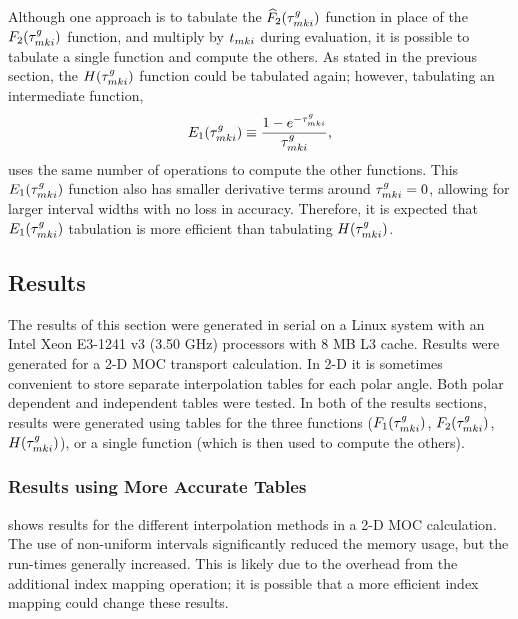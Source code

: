 {{{      Although one approach is to tabulate the $\modFunc$ function in place of the $F_2(\segopt)$ function, and multiply by $\nsegl$ during evaluation, it is possible to tabulate a single function and compute the others.
      As stated in the previous section, the $H(\segopt)$ function could be tabulated again; however, tabulating an intermediate function,
      \begin{equation}\label{eq:LSMOC:ET:E1}
        E_1(\segopt) \defined \frac{1-e^{-\segopt}}{\segopt},
      \end{equation}
      uses the same number of operations to compute the other functions.
      This $E_1(\segopt)$ function also has smaller derivative terms around $\segopt=0$, allowing for larger interval widths with no loss in accuracy.
      Therefore, it is expected that $E_1(\segopt)$ tabulation is more efficient than tabulating $H(\segopt)$.
    }
    \subsection{Results}{\label{ssec:LSMOC:ET:Results}
      The results of this section were generated in serial on a Linux system with an Intel Xeon E3-1241 v3 (3.50 GHz) processors with 8 MB L3 cache.
      Results were generated for a 2-D \ac{MOC} transport calculation.
      In 2-D it is sometimes convenient to store separate interpolation tables for each polar angle.
      Both polar dependent and independent tables were tested.
      In both of the results sections, results were generated using tables for the three functions ($F_1(\segopt)$, $F_2(\segopt)$, $H(\segopt)$), or a single function (which is then used to compute the others).

      \subsubsection{Results using More Accurate Tables}{\label{sssec:LSMOC:ET:Results using More Accurate Tables}
         shows results for the different interpolation methods in a 2-D \ac{MOC} calculation.
        The use of non-uniform intervals significantly reduced the memory usage, but the run-times generally increased.
        This is likely due to the overhead from the additional index mapping operation; it is possible that a more efficient index mapping could change these results.

}}}}
